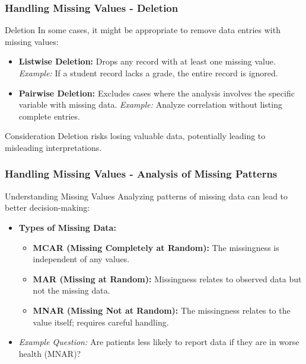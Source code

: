 \documentclass[aspectratio=169]{beamer}
\begin{document}
\begin{frame}[fragile]
    \frametitle{Handling Missing Values - Deletion}
    \begin{block}{Deletion}
        In some cases, it might be appropriate to remove data entries with missing values:
    \end{block}
    \begin{itemize}
        \item \textbf{Listwise Deletion:} Drops any record with at least one missing value.
            \textit{Example:} If a student record lacks a grade, the entire record is ignored.
        \item \textbf{Pairwise Deletion:} Excludes cases where the analysis involves the specific variable with missing data.
            \textit{Example:} Analyze correlation without listing complete entries.
    \end{itemize}
    \begin{block}{Consideration}
        Deletion risks losing valuable data, potentially leading to misleading interpretations.
    \end{block}
\end{frame}

\begin{frame}[fragile]
    \frametitle{Handling Missing Values - Analysis of Missing Patterns}
    \begin{block}{Understanding Missing Values}
        Analyzing patterns of missing data can lead to better decision-making:
    \end{block}
    \begin{itemize}
        \item \textbf{Types of Missing Data:}
            \begin{itemize}
                \item \textbf{MCAR (Missing Completely at Random):} The missingness is independent of any values.
                \item \textbf{MAR (Missing at Random):} Missingness relates to observed data but not the missing data.
                \item \textbf{MNAR (Missing Not at Random):} The missingness relates to the value itself; requires careful handling.
            \end{itemize}
        \item \textit{Example Question:} Are patients less likely to report data if they are in worse health (MNAR)?
    \end{itemize}
\end{frame}
\end{document}
